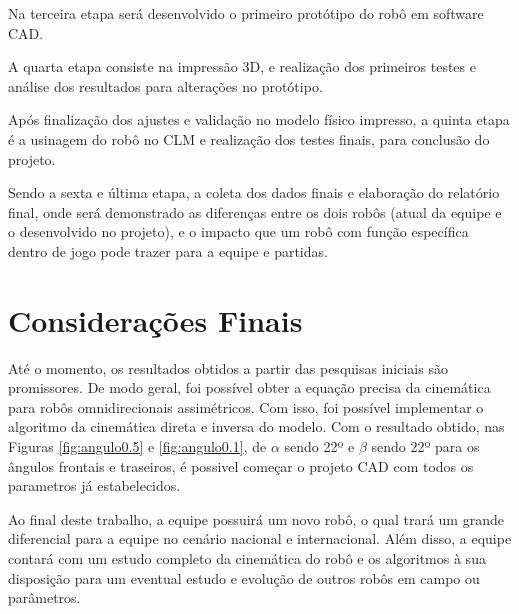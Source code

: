 \documentclass[deposito, acronym, symbols]{fei}
\begin{document}
Na terceira etapa será desenvolvido o primeiro protótipo do robô em software CAD. 

A quarta etapa consiste na impressão 3D, e realização dos primeiros testes e análise dos resultados para alterações no protótipo. 

Após finalização dos ajustes e validação no modelo físico impresso, a quinta etapa é a usinagem do robô no CLM e realização dos testes finais, para conclusão do projeto.

Sendo a sexta e última etapa, a coleta dos dados finais e elaboração do relatório final, onde será demonstrado as diferenças entre os dois robôs (atual da equipe e o desenvolvido no projeto), e o impacto que um robô com função específica dentro de jogo pode trazer para a equipe e partidas.

\chapter{Considerações Finais}

Até o momento, os resultados obtidos a partir das pesquisas iniciais são promissores. De modo geral, foi possível obter a equação precisa da cinemática para robôs omnidirecionais assimétricos. Com isso, foi possível implementar o algoritmo da cinemática direta e inversa do modelo. Com o resultado obtido, nas Figuras  \ref{fig:angulo0.5} e \ref{fig:angulo0.1}, de $\alpha$ sendo 22º e $\beta$ sendo 22º para os ângulos frontais e traseiros, é possivel começar o projeto CAD com todos os parametros já estabelecidos.

Ao final deste trabalho, a equipe possuirá um novo robô, o qual trará um grande diferencial para a equipe no cenário nacional e internacional. Além disso, a equipe contará com um estudo completo da cinemática do robô e os algoritmos à sua disposição para um eventual estudo e evolução de outros  robôs em campo ou parâmetros.


\printbibliography
\end{document}
